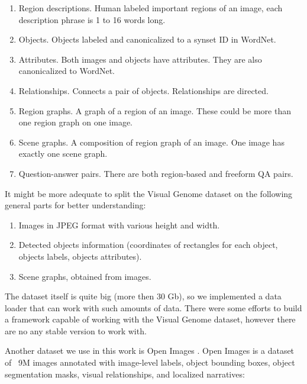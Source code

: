\begin{enumerate}
    \item Region descriptions. Human labeled important regions of an image, each description phrase is 1 to 16 words long.
    \item Objects. Objects labeled and canonicalized to a synset ID in WordNet.
    \item Attributes. Both images and objects have attributes. They are also canonicalized to WordNet.
    \item Relationships. Connects a pair of objects. Relationships are directed.
    \item Region graphs. A graph of a region of an image. These could be more than one region graph on one image.
    \item Scene graphs. A composition of region graph of an image. One image has exactly one scene graph.
    \item Question-answer pairs. There are both region-based and freeform QA pairs.
\end{enumerate}

It might be more adequate to split the Visual Genome dataset on the following general parts for better understanding:

\begin{enumerate}
    \item Images in JPEG format with various height and width.
    \item Detected objects information (coordinates of rectangles for each object, objects labels, objects attributes).
    \item Scene graphs, obtained from images.
\end{enumerate}

The dataset itself is quite big (more then 30 Gb), so we implemented a data loader that can work with such amounts of data. There were some efforts \cite{yang_2018_graph} to build a framework capable of working with the Visual Genome dataset, however there are no any stable version to work with.

Another dataset we use in this work is Open Images \cite{OpenImages2}. Open Images is a dataset of ~9M images annotated with image-level labels, object bounding boxes, object segmentation masks, visual relationships, and localized narratives:


